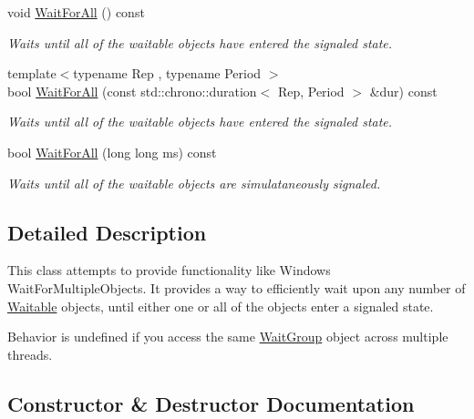 \begin{DoxyCompactItemize}
void \mbox{\hyperlink{class_command_lib_1_1_wait_group_a4fb05642c6c71d13c0e809f429c4baa0}{Wait\+For\+All}} () const
\begin{DoxyCompactList}\small\item\em Waits until all of the waitable objects have entered the signaled state.\end{DoxyCompactList}\item 
{\footnotesize template$<$typename Rep , typename Period $>$ }\\bool \mbox{\hyperlink{class_command_lib_1_1_wait_group_a490ab91ba70877fa5aa6567fbfdec9ad}{Wait\+For\+All}} (const std\+::chrono\+::duration$<$ Rep, Period $>$ \&dur) const
\begin{DoxyCompactList}\small\item\em Waits until all of the waitable objects have entered the signaled state.\end{DoxyCompactList}\item 
bool \mbox{\hyperlink{class_command_lib_1_1_wait_group_a9f5c6931a0eb4948a9341a8faa3c26ce}{Wait\+For\+All}} (long long ms) const
\begin{DoxyCompactList}\small\item\em Waits until all of the waitable objects are simulataneously signaled.\end{DoxyCompactList}\end{DoxyCompactItemize}


\subsection{Detailed Description}
This class attempts to provide functionality like Windows\textquotesingle{} Wait\+For\+Multiple\+Objects. It provides a way to efficiently wait upon any number of \mbox{\hyperlink{class_command_lib_1_1_waitable}{Waitable}} objects, until either one or all of the objects enter a signaled state. 

Behavior is undefined if you access the same \mbox{\hyperlink{class_command_lib_1_1_wait_group}{Wait\+Group}} object across multiple threads.

\subsection{Constructor \& Destructor Documentation}
\mbox{\label{class_command_lib_1_1_wait_group_a813fba9c0d92994c177eee9e6289dc74}} 
